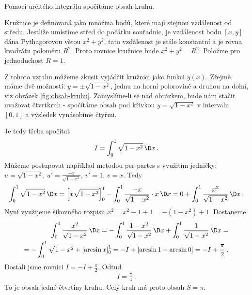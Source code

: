\begin{example}
    Pomocí určitého integrálu spočítáme obsah kruhu. 
    
    Kružnice je definovaná jako množina bodů, které mají stejnou vzdálenost od středu. Jestliže umístíme střed do počátku souřadnic, je vzdálenost bodu $[x,y]$ dána Pythagorovou větou $x^2 + y^2$, tato vzdálenost je stále konstantní a je rovna kvadrátu poloměru $R^2$. Proto rovnice kružnice bude $x^2 + y^2 = R^2$. Položme pro jednoduchost $R=1$.
    
    Z tohoto vztahu můžeme zkusit vyjádřit kružnici jako funkci $y(x)$. Zřejmě máme dvě možnosti: $y = \pm \sqrt{1-x^2}$, jednu na horní polorovině a druhou na dolní, viz obrázek \ref{fig:obsah-kruhu}. Zamyslíme-li se nad obrázkem, bude nám stačit uvažovat čtvrtkruh - spočítáme obsah pod křivkou $y = \sqrt{1-x^2}$ v intervalu $[0,1]$ a výsledek vynásobíme čtyřmi.

    Je tedy třeba spočítat \begin{align}
        I = \int_0^1 \sqrt{1-x^2} \, \D x \:.
    \end{align}
    Můžeme postupovat například metodou per-partes s využitím jedničky: $u=\sqrt{1-x^2}$, $u'=\frac{-x}{\sqrt{1-x^2}}$, $v'=1$, $v=x$. Tedy \begin{align}
        \int_0^1 \sqrt{1-x^2} \, \D x = \left[ x \sqrt{1-x^2}\right]_0^1 - \int_0^1 \frac{-x}{\sqrt{1-x^2}} \cdot x \, \D x = 0 + \int_0^1 \frac{x^2}{\sqrt{1-x^2}} \, \D x \:.
    \end{align}
    Nyní využijeme šikovného rozpisu $x^2 = x^2-1+1 = -(1-x^2) + 1$. Dostaneme \begin{align}
        \int_0^1 \frac{x^2}{\sqrt{1-x^2}} \, \D x = -\int_0^1 \frac{1-x^2}{\sqrt{1-x^2}} \, \D x + \int_0^1 \frac{1}{\sqrt{1-x^2}} \, \D x 
        = \\ = 
         -\int_0^1 \sqrt{1-x^2} + \left[ \arcsin x \right]_0^1 = - I + \left[ \arcsin 1 - \arcsin 0 \right] = - I + \frac{\pi}{2} \:.
    \end{align}
    Dostali jsme rovnici $I = - I + \frac{\pi}{2}$. Odtud \begin{align}
        I = \frac{\pi}{4} \:.
    \end{align}
    To je obsah jedné čtvrtiny kruhu. Celý kruh má proto obsah $S = \pi$.


\end{example}

